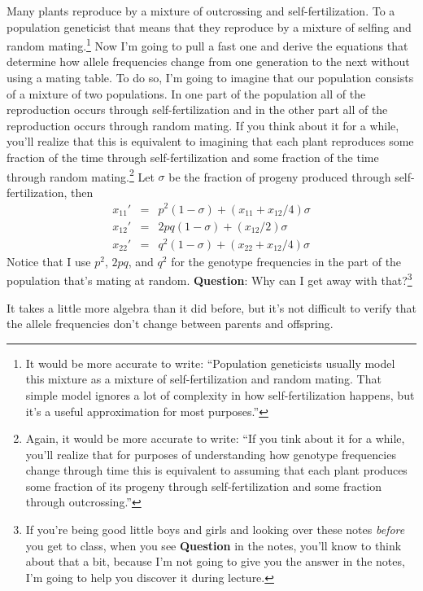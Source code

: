 Many plants reproduce by a mixture of outcrossing and
self-fertilization. To a
population geneticist that means that they reproduce by a mixture of
selfing and random mating.\footnote{It would be more accurate to
  write: ``Population geneticists usually model this mixture as a
  mixture of self-fertilization and random mating. That simple model
  ignores a lot of complexity in how self-fertilization happens, but
  it's a useful approximation for most purposes.''} Now I'm going to
pull a fast one and derive the equations that determine how allele
frequencies change from one generation to the next without using a
mating table. To do so, I'm going to imagine that our population
consists of a mixture of two populations. In one part of the
population all of the reproduction occurs through self-fertilization
and in the other part all of the reproduction occurs through random
mating. If you think about it for a while, you'll realize that this is
equivalent to imagining that each plant reproduces some fraction of
the time through self-fertilization and some fraction of the time
through random mating.\footnote{Again, it would be more accurate to
  write: ``If you tink about it for a while, you'll realize that for
  purposes of understanding how genotype frequencies change through
  time this is equivalent to assuming that each plant produces some
  fraction of its progeny through self-fertilization and some fraction
  through outcrossing.''} Let $\sigma$ be the fraction of progeny
produced through self-fertilization, then
\begin{eqnarray}
x_{11}' &=& p^2(1-\sigma) + (x_{11} + x_{12}/4)\sigma \\
x_{12}' &=& 2pq(1-\sigma) + (x_{12}/2)\sigma  \label{eq:het} \\
x_{22}' &=& q^2(1-\sigma) + (x_{22} + x_{12}/4)\sigma
\end{eqnarray}
Notice that I use $p^2$, $2pq$, and $q^2$ for the genotype frequencies
in the part of the population that's mating at random. {\bf Question}:
Why can I get away with that?\footnote{If you're being good little
  boys and girls and looking over these notes {\it before\/} you get
  to class, when you see {\bf Question} in the notes, you'll know to
  think about that a bit, because I'm not going to give you the answer
  in the notes, I'm going to help you discover it during lecture.}

It takes a little more algebra than it did before, but it's not
difficult to verify that the allele frequencies don't change between
parents and offspring.

